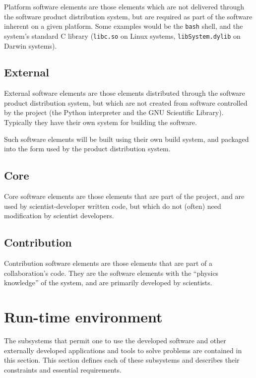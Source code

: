 \documentclass[draftmode,draftwater]{memarticle}
\begin{document}
Platform software elements are those elements which are not delivered
through the software product distribution system, but are required as
part of the software inherent on a given platform. Some examples would
be the \texttt{bash} shell, and the system's standard C library
(\texttt{libc.so} on Linux systems, \texttt{libSystem.dylib} on Darwin
systems).

\subsection{External}

External software elements are those elements distributed through the
software product distribution system, but which are not created from
software controlled by the project (\eg the Python interpreter and the
GNU Scientific Library). Typically they have their own system for
building the software.

Such software elements will be built using their own build system, and
packaged into the form used by the product distribution system.

\subsection{Core}

Core software elements are those elements that are part of the project,
and are used by scientist-developer written code, but which do not
(often) need modification by scientist developers.

\subsection{Contribution}

Contribution software elements are those elements that are part of a
collaboration's code. They are the software elements with the ``physics
knowledge'' of the system, and are primarily developed by scientists.

\section{Run-time environment}

The subsystems that permit one to use the developed software and other
externally developed applications and tools to solve problems are
contained in this section. This section defines each of these
subsystems and describes their constraints and essential requirements.
\end{document}
